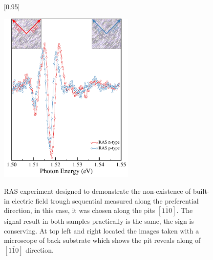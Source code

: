 \begin{figure}
	[0.95\FBwidth]
	{ \caption{RAS experiment designed to demonstrate the non-existence of built-in electric field trough sequential measured along the preferential direction, in this case, it was chosen  along the pits $[1\overline{1}0]$\cite{weyher2010defect}. The signal result in both samples practically is the same, the sign is conserving. At top left and right located the images taken with a microscope of back substrate which shows the pit reveals along of $[1\overline{1}0]$ direction. 
	}\label{fig:chapter-3-subsec-ras-orientation}}
	{
	\includegraphics[width=0.6\textwidth]{../figures/chapter-3/ras-plots/out/ras-set-5.pdf}
	}
\end{figure}

